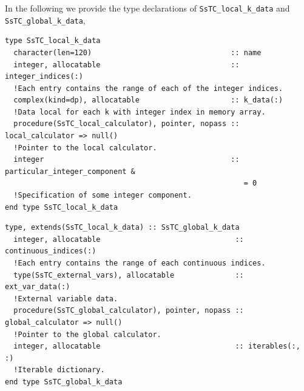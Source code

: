 \documentclass[10pt,a4paper]{article}
\begin{document}
In the following we provide the type declarations of \verb|SsTC_local_k_data| and \verb|SsTC_global_k_data|,
\begin{codebox}{}
\begin{lstlisting}[caption={Derived type corresponding to ``local k data".},captionpos=b]
type SsTC_local_k_data
  character(len=120)                                :: name
  integer, allocatable                              :: integer_indices(:)
  !Each entry contains the range of each of the integer indices.
  complex(kind=dp), allocatable                     :: k_data(:)
  !Data local for each k with integer index in memory array.
  procedure(SsTC_local_calculator), pointer, nopass :: local_calculator => null()
  !Pointer to the local calculator.
  integer                                           :: particular_integer_component &
                                                       = 0 
  !Specification of some integer component.
end type SsTC_local_k_data
\end{lstlisting}
\end{codebox}
\begin{codebox}{}
\begin{lstlisting}[caption={Derived type corresponding to ``global k data".},captionpos=b]
type, extends(SsTC_local_k_data) :: SsTC_global_k_data
  integer, allocatable                               :: continuous_indices(:)
  !Each entry contains the range of each continuous indices.
  type(SsTC_external_vars), allocatable              :: ext_var_data(:)
  !External variable data.
  procedure(SsTC_global_calculator), pointer, nopass :: global_calculator => null()
  !Pointer to the global calculator.
  integer, allocatable                               :: iterables(:, :)
  !Iterable dictionary.
end type SsTC_global_k_data
\end{lstlisting}
\end{codebox}
\end{document}
